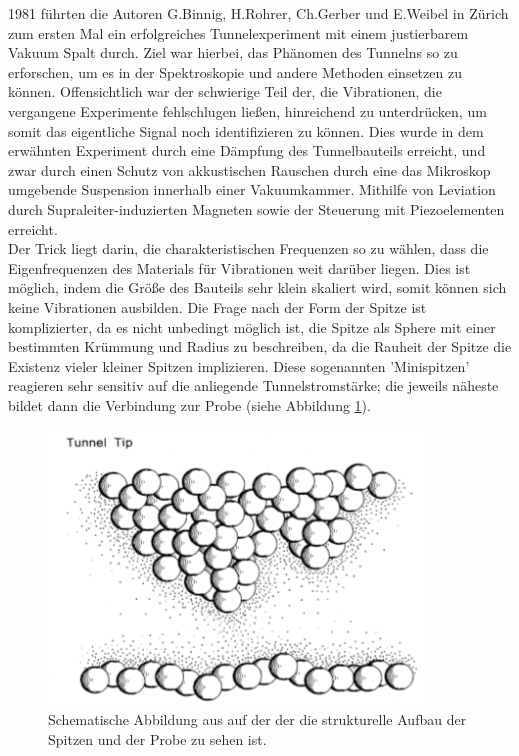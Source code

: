 1981 führten die Autoren G.Binnig, H.Rohrer,
Ch.Gerber und E.Weibel in Zürich zum ersten Mal ein erfolgreiches
Tunnelexperiment \cite{binnig1982tunneling} 
mit einem justierbarem Vakuum Spalt durch. 
Ziel war hierbei, das Phänomen des Tunnelns so zu erforschen,
um es in der Spektroskopie und andere Methoden einsetzen zu können. 
Offensichtlich war der schwierige Teil der, die Vibrationen,
die vergangene Experimente fehlschlugen ließen, hinreichend zu
unterdrücken, um somit das eigentliche Signal noch identifizieren zu
können. Dies wurde in dem erwähnten Experiment durch eine 
Dämpfung des Tunnelbauteils erreicht, und zwar durch einen Schutz
von akkustischen Rauschen durch eine das Mikroskop umgebende 
Suspension innerhalb einer Vakuumkammer. Mithilfe von Leviation durch
Supraleiter-induzierten Magneten sowie
der Steuerung mit Piezoelementen erreicht. \\ Der Trick liegt darin,
die charakteristischen Frequenzen so zu wählen, dass die 
Eigenfrequenzen des Materials für Vibrationen weit darüber liegen.
Dies ist möglich, indem die Größe des Bauteils sehr klein
skaliert wird, somit können sich keine Vibrationen ausbilden.
Die Frage nach der Form der Spitze ist komplizierter, da es 
nicht unbedingt möglich ist, die Spitze als Sphere mit einer
bestimmten Krümmung und Radius zu beschreiben, da die Rauheit der
Spitze die Existenz vieler kleiner Spitzen implizieren. Diese
sogenannten 'Minispitzen' reagieren sehr sensitiv auf die anliegende
Tunnelstromstärke; die jeweils näheste bildet dann die Verbindung
zur Probe (siehe Abbildung \ref{fig:multitip}).\\ 
\begin{figure}
\includegraphics[width=10cm]{pics/multitip}
\caption{ Schematische Abbildung aus \cite{binnig1987scanning}
auf der der die strukturelle Aufbau der Spitzen und der Probe 
zu sehen ist.} 
 \label{fig:multitip}
\end{figure}
